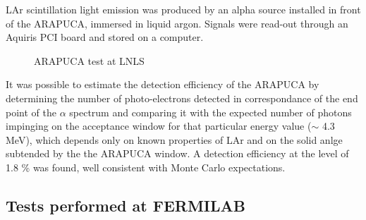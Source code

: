 LAr scintillation light emission was produced by an alpha source installed in front of the ARAPUCA, immersed in liquid argon. Signals were read-out through an Aquiris PCI board and stored on a computer.\\

\begin{figure}[ht]
\begin{center}
\caption{ARAPUCA test at LNLS} \label{LNLS_test}
\end{center}
\end{figure}

It was possible to estimate the detection efficiency of the ARAPUCA by 
determining the number of photo-electrons detected in correspondance of the end point of the $\alpha$ spectrum 
and comparing it with the expected number of photons impinging on the acceptance window for that 
particular energy value ($\sim$ 4.3 MeV), which depends only on known properties of LAr and on the solid 
anlge subtended by the the ARAPUCA window. A detection efficiency at the level of 1.8 \% 
was found, well consistent with Monte Carlo expectations.

\subsection{Tests performed at FERMILAB}
\label{subsec:test_fnal}

